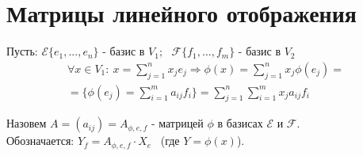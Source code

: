 \section{Матрицы линейного отображения}
    Пусть: $\mathcal{E} \{e_1,...,e_n\}$ - базис в $V_1$; \ $\mathcal{F} \{f_1,...,f_m\}$ - базис в $V_2$
    \begin{multline*}
        \forall x \in V_1 : \ x = \sum \limits_{j=1}^n x_je_j \Longrightarrow \phi(x) = \sum \limits_{j=1}^n x_j \phi(e_j)= \\ 
        = \{\phi(e_j) = \sum \limits_{i=1}^m a_{ij}f_i\} = \sum \limits_{j=1}^n \sum \limits_{i=1}^m x_ja_{ij}f_i
    \end{multline*}
    \begin{definition}
        Назовем $A = (a_{ij}) = A_{\phi,e,f}$ - матрицей $\phi$ в базисах $\mathcal{E}$ и $\mathcal{F}$.\\ 
        Обозначается: $Y_f = A_{\phi,e,f} \cdot X_e$ \ (где $Y = \phi(x)$).    
    \end{definition}  

